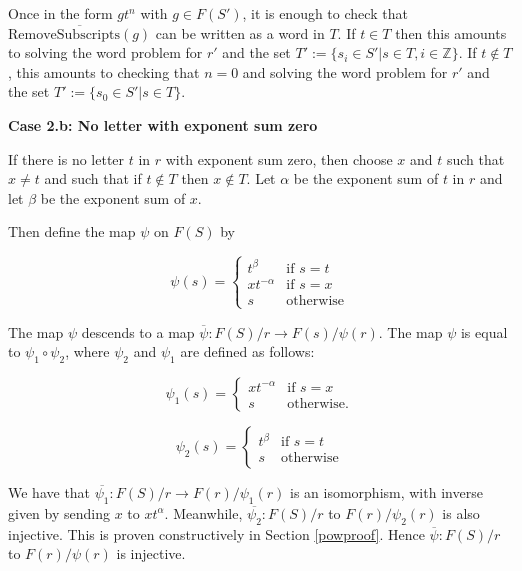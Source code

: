 \documentclass[11pt]{article} %
\theoremstyle{definition}
\theoremstyle{definition}
\theoremstyle{definition}
\theoremstyle{definition}
\theoremstyle{definition}
\theoremstyle{definition}
\begin{document}
Once in the form $g t^n$ with $g \in F(S')$, it is enough to check that
$\overline{\text{RemoveSubscripts}(g)}$ can be written as a word in $T$.
If $t \in T$ then this amounts to solving the word problem for $r'$
and the set $T' := \{ s_i \in S' | s \in T, i \in \mathbb{Z} \}$. If $t \notin T$,
this amounts to checking that $n = 0$ and solving the word problem for
$r'$ and the set $T' := \{s_0 \in S' | s \in T\}$.

\textbf{Case 2.b: No letter with exponent sum zero}\label{noexpsumzero}

If there is no letter $t$ in $r$ with exponent sum zero, then choose $x$
and $t$ such that $x \ne t$ and such that if $t \notin T$ then $x \notin T$.
Let $\alpha$ be the exponent sum
of $t$ in $r$ and let $\beta$ be the exponent sum of $x$.

Then define the map $\psi$ on $F(S)$ by

\begin{equation}
  \psi(s) =
  \begin{cases}
     t^\beta & \text{if }s = t \\
     xt^{-\alpha} &\text{if } s = x \\
     s & \text{otherwise}
  \end{cases}
\end{equation}

The map $\psi$ descends to a map $\overline{\psi}: F(S) / r \to F(s) / \psi(r)$. The map
$\psi$ is equal to $\psi_1 \circ \psi_2$,
where $\psi_2$ and $\psi_1$ are defined as follows:

\begin{equation}
  \psi_1(s) =
  \begin{cases}
     xt^{-\alpha} &\text{if } s = x \\
     s & \text{otherwise.}
  \end{cases}
\end{equation}

\begin{equation}
  \psi_2(s) =
  \begin{cases}
     t^\beta & \text{if } s = t \\
     s & \text{otherwise}
  \end{cases}
\end{equation}

We have that $\overline{\psi_1}: F(S) / r \to F(r) / \psi_1(r)$ is an isomorphism, with inverse given by sending $x$ to $xt^\alpha$. Meanwhile,
$\overline{\psi_2}: F(S) / r$ to $F(r) / \psi_2(r)$
is also injective.
This is proven constructively in Section \ref{powproof}.
Hence $\overline{\psi}: F(S) / r$ to $F(r) / \psi(r)$ is injective.
\end{document}
